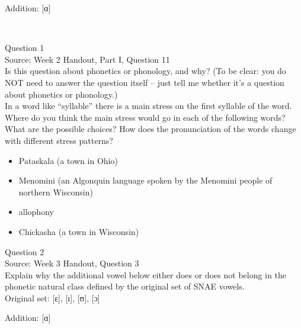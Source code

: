 \documentclass[12pt]{article}
\begin{document}
Addition: {[ɑ]}


\newpage

\begin{center}
\textbf{{\color{red}{\HUGE END OF EXAM}}}\\

\end{center}
\newpage

\begin{center}
\textbf{{\color{blue}{\HUGE START OF EXAM\\}}}

\textbf{{\color{blue}{\HUGE Student ID: 54125\\}}}

\textbf{{\color{blue}{\HUGE 4:50\\}}}

\end{center}
\newpage

{\large Question 1}\\

Source: Week 2 Handout, Part I, Question 11\\

Is this question about phonetics or phonology, and why? (To be clear: you do NOT need to answer the question itself -- just tell me whether it's a question about phonetics or phonology.)\\

In a word like ``syllable'' there is a main stress on the first syllable of the word. Where do you think the main stress would go in each of the following words? What are the possible choices? How does the pronunciation of the words change with different stress patterns? \begin{itemize} \item Pataskala (a town in Ohio) \item Menomini (an Algonquin language spoken by the Menomini people of northern Wisconsin) \item allophony \item Chickasha (a town in Wisconsin) \end{itemize}


\newpage

{\large Question 2}\\

Source: Week 3 Handout, Question 3\\

Explain why the additional vowel below either does or does not belong in the phonetic natural class defined by the original set of SNAE vowels.\\

Original set: {[ɛ]}, {[ɪ]}, {[ʊ]}, {[ɔ]}

Addition: {[ɑ]}


\newpage

\begin{center}
\textbf{{\color{red}{\HUGE END OF EXAM}}}\\

\end{center}
\newpage
\end{document}
